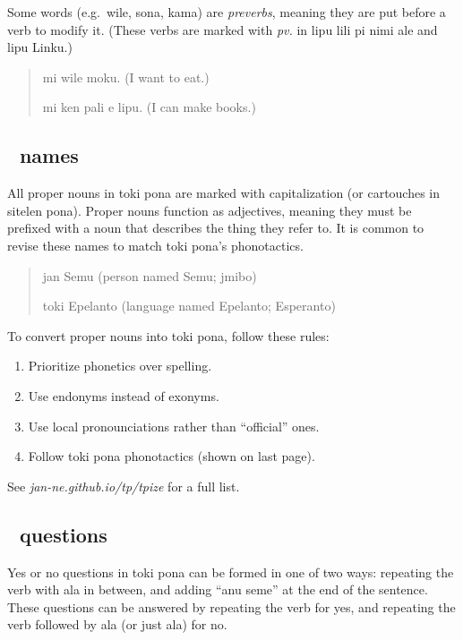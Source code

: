 \documentclass[statementpaper,oneside,article,14pt]{memoir}
\begin{document}
\noindent Some words (e.g.\ wile, sona, kama) are \textit{preverbs}, meaning they are put before a verb
to modify it. (These verbs are marked with \textit{pv.} in lipu lili pi nimi ale and lipu Linku.)

\begin{quote}
  mi wile moku. (I want to eat.)

  mi ken pali e lipu. (I can make books.)
\end{quote}

\subsection{{\sitpon󱤑} names}

\noindent All proper nouns in toki pona are marked with capitalization (or cartouches in sitelen pona).
Proper nouns function as adjectives, meaning they must be prefixed with a noun that describes 
the thing they refer to. It is common to revise these names to match toki pona's phonotactics.

\begin{quote}
  jan Semu (person named Semu; jmibo)

  toki Epelanto (language named Epelanto; Esperanto)
\end{quote}

To convert proper nouns into toki pona, follow these rules:

\begin{enumerate}[itemsep=-5pt]
\item Prioritize phonetics over spelling.
\item Use endonyms instead of exonyms.
\item Use local pronounciations rather than ``official'' ones.
\item Follow toki pona phonotactics (shown on last page).
\end{enumerate}

\noindent See \textit{jan-ne.github.io/tp/tpize} for a full list.

\subsection{{\sitpon󱥙} questions}

\noindent Yes or no questions in toki pona can be formed in one of two ways: repeating the verb with ala in 
between, and adding ``anu seme'' at the end of the sentence. These questions can be answered 
by repeating the verb for yes, and repeating the verb followed by ala (or just ala) for no.
\end{document}
